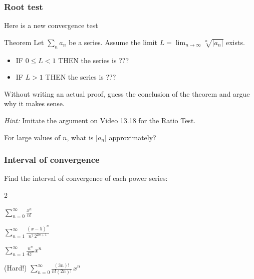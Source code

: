 \begin{frame}[t]
	\fontsize{13}{13}\selectfont
	\frametitle{Root test}

	Here is a new convergence test
	\begin{block}{Theorem}
		Let $\displaystyle \sum_{n}a_{n}$ be a series. Assume the limit
		$\displaystyle L= \lim_{n \to \infty}\sqrt[n]{|a_{n}|}$ exists.
		\begin{itemize}
			\item IF $0 \leq L <1$ THEN the series is ???

			\item IF $L > 1$ THEN the series is ???
		\end{itemize}
	\end{block}

	Without writing an actual proof, guess the conclusion of the theorem and argue
	why it makes sense.

	\emph{Hint:} Imitate the argument on Video 13.18 for the Ratio Test.

	For large values of $n$, what is $|a_{n}|$ approximately?
\end{frame}

\begin{frame}[t]
	\frametitle{Interval of convergence}

	Find the interval of convergence of each power series:

	\begin{enumerate}
	\end{enumerate}
\end{frame}


